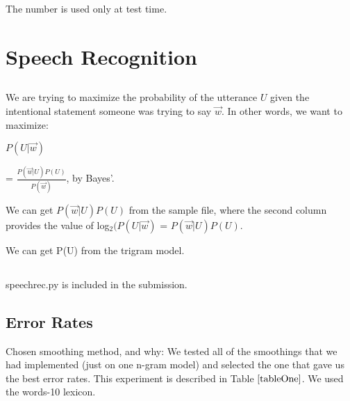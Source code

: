 \documentclass[12pt, letterpaper]{article}
\begin{document}
The number is used only at test time.

\section{Speech Recognition}
\subsection{}


We are trying to maximize the probability of the utterance $U$ given the intentional statement someone was trying to say $\overrightarrow{w}$. In other words, we want to maximize: 

$P(U|\overrightarrow{w})$

= $\frac{P(\overrightarrow{w}|U) P(U)}{P(\overrightarrow{w})}$, by Bayes'.

We can get $P(\overrightarrow{w}|U) P(U)$ from the sample file, where the second column provides the value of log$_{2}(P(U|\overrightarrow{w})$ = $P(\overrightarrow{w}|U) P(U)$.

We can get P(U) from the trigram model. 

\subsection{}
speechrec.py is included in the submission.

\subsection{Error Rates}

Chosen smoothing method, and why: We tested all of the smoothings that we had implemented (just on one n-gram model) and selected the one that gave us the best error rates. This experiment is described in Table $\ref{tableOne}$. We used the words-10 lexicon.
\end{document}
